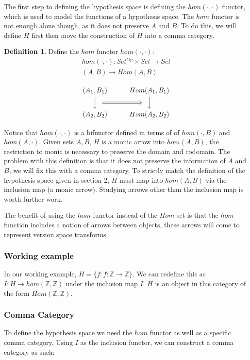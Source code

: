 \documentclass{article}
\theoremstyle{definition}
\newtheorem{definition}{Definition}[section]
\begin{document}
The first step to defining the hypothesis space is defining the $hom(\cdot, \cdot)$ functor, which is used to model the functions of a hypothesis space. The $hom$ functor is not enough alone though, as it does not preserve $A$ and $B$. To do this, we will define $H$ first then move the construction of $H$ into a comma category.
\begin{definition}
Define the $hom$ functor $hom(\cdot,\cdot)$:
\begin{gather*}
    hom(\cdot,\cdot):Set^{Op} \times Set \rightarrow Set \\
    (A,B) \rightarrow Hom(A,B) \\
\end{gather*}
\[\begin{tikzcd}
	{(A_1, B_1)} & {Hom(A_1, B_1)} \\
	{(A_2,B_2)} & {Hom(A_2,B_2)}
	\arrow[""{name=0, anchor=center, inner sep=0}, from=1-2, to=2-2]
	\arrow[""{name=1, anchor=center, inner sep=0}, from=1-1, to=2-1]
	\arrow[shorten <=10pt, shorten >=10pt, Rightarrow, from=1, to=0]
\end{tikzcd}\]
\end{definition}
Notice that $hom(\cdot, \cdot)$ is a bifunctor defined in terms of of $hom(\cdot,B)$ and $hom(A,\cdot)$. Given sets $A, B$, $H$ is a monic arrow into $hom(A,B)$, the restriction to monic is necessary to preserve the domain and codomain. The problem with this definition is that it does not preserve the information of $A$ and $B$, we will fix this with a comma category. To strictly match the definition of the hypothesis space given in section 2, $H$ must map into $hom(A,B)$ via the inclusion map (a monic arrow). Studying arrows other than the inclusion map is worth further work. 

The benefit of using the $hom$ functor instead of the $Hom$ set is that the $hom$ function includes a notion of arrows between objects, these arrows will come to represent version space transforms.

\subsubsection{Working example}
In our working example, $H=\{f: f: \mathbb{Z} \rightarrow \mathbb{Z}\}$. We can redefine this as $I: H\rightarrow hom(\mathbb{Z},\mathbb{Z})$ under the inclusion map $I$. $H$ is an object in this category of the form $Hom(\mathbb{Z},\mathbb{Z})$.

\subsubsection{Comma Category}
To define the hypothesis space we need the $hom$ functor as well as a specific comma category. Using $I$ as the inclusion functor, we can construct a comma category as such: 
\end{document}
